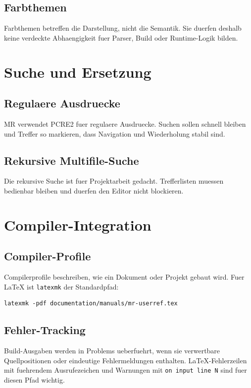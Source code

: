 \documentclass[a4paper,11pt]{report}
\newcommand{\mr}{\textsc{MR}}
\begin{document}
\section{Farbthemen}

Farbthemen betreffen die Darstellung, nicht die Semantik. Sie duerfen deshalb
keine verdeckte Abhaengigkeit fuer Parser, Build oder Runtime-Logik bilden.

\chapter{Suche und Ersetzung}

\section{Regulaere Ausdruecke}

\mr{} verwendet PCRE2 fuer regulaere Ausdruecke. Suchen sollen schnell bleiben
und Treffer so markieren, dass Navigation und Wiederholung stabil sind.

\section{Rekursive Multifile-Suche}

Die rekursive Suche ist fuer Projektarbeit gedacht. Trefferlisten muessen
bedienbar bleiben und duerfen den Editor nicht blockieren.

\chapter{Compiler-Integration}

\section{Compiler-Profile}

Compilerprofile beschreiben, wie ein Dokument oder Projekt gebaut wird. Fuer
LaTeX ist \texttt{latexmk} der Standardpfad:

\begin{verbatim}
latexmk -pdf documentation/manuals/mr-userref.tex
\end{verbatim}

\section{Fehler-Tracking}

Build-Ausgaben werden in Problems ueberfuehrt, wenn sie verwertbare
Quellpositionen oder eindeutige Fehlermeldungen enthalten. LaTeX-Fehlerzeilen
mit fuehrendem Ausrufezeichen und Warnungen mit \texttt{on input line N} sind
fuer diesen Pfad wichtig.
\end{document}
